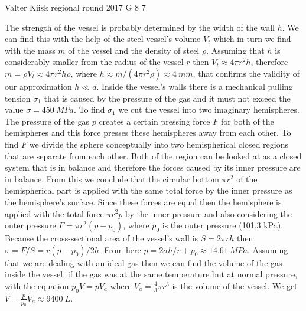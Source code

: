 \documentclass[11pt]{article}
\begin{document}
{Valter Kiisk} %
{regional round} %
{2017} %
{G 8} %
{7} %
{

\ifEngSolution
The strength of the vessel is probably determined by the width of the wall $h$. We can find this with the help of the steel vessel’s volume $V_t$ which in turn we find with the mass $m$ of the vessel and the density of steel $\rho$. Assuming that $h$ is considerably smaller from the radius of the vessel $r$ then $V_t\approx4\pi r^2 h$, therefore $m=\rho V_t \approx 4\pi r^2h\rho$, where $h\approx m/(4\pi r^2\rho)\approx \SI{4}{mm}$, that confirms the validity of our approximation $h\ll d$. Inside the vessel’s walls there is a mechanical pulling tension $\sigma_1$ that is caused by the pressure of the gas and it must not exceed the value $\sigma=\SI{450}{MPa}$. To find $\sigma_1$ we cut the vessel into two imaginary hemispheres. The pressure of the gas $p$ creates a certain pressing force $F$ for both of the hemispheres and this force presses these hemispheres away from each other. To find $F$ we divide the sphere conceptually into two hemispherical closed regions that are separate from each other. Both of the region can be looked at as a closed system that is in balance and therefore the forces caused by its inner pressure are in balance. From this we conclude that the circular bottom $\pi r^2$ of the hemispherical part is applied with the same total force by the inner pressure as the hemisphere’s surface. Since these forces are equal then the hemisphere is applied with the total force $\pi r^2 p$ by the inner pressure and also considering the outer pressure $F=\pi r^2(p-p_0)$, where $p_0$ is the outer pressure (101,3 kPa). Because the cross-sectional area of the vessel’s wall is $S=2\pi rh$ then $\sigma=F/S=r(p-p_0)/2h$. From here $p=2\sigma h/r+p_0\approx \SI{14.61}{MPa}$. Assuming that we are dealing with an ideal gas then we can find the volume of the gas inside the vessel, if the gas was at the same temperature but at normal pressure, with the equation $p_0V=pV_a$ where $V_a=\frac{4}{3}\pi r^3$ is the volume of the vessel. We get $V=\frac{p}{p_0}V_a\approx\SI{9400}{L}$.
\fi
}
\end{document}
